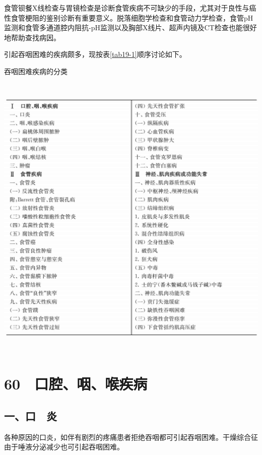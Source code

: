 食管钡餐X线检查与胃镜检查是诊断食管疾病不可缺少的手段，尤其对于良性与癌性食管梗阻的鉴别诊断有重要意义。脱落细胞学检查和食管动力学检查，食管pH监测和食管多通道腔内阻抗-pH监测以及胸部X线片、超声内镜及CT检查也能很好地帮助查找病因。

引起吞咽困难的疾病颇多，现按表\ref{tab19-1}顺序讨论如下。

\begin{table}[htbp]
\centering
\caption{吞咽困难疾病的分类}
\label{tab19-1}
\includegraphics[width=5.90625in,height=5.55208in]{./images/Image00119.jpg}
\end{table}

\protect\hypertarget{text00155.html}{}{}

\section{60　口腔、咽、喉疾病}

\subsection{一、口　炎}

各种原因的口炎，如伴有剧烈的疼痛患者拒绝吞咽都可引起吞咽困难。干燥综合征由于唾液分泌减少也可引起吞咽困难。


